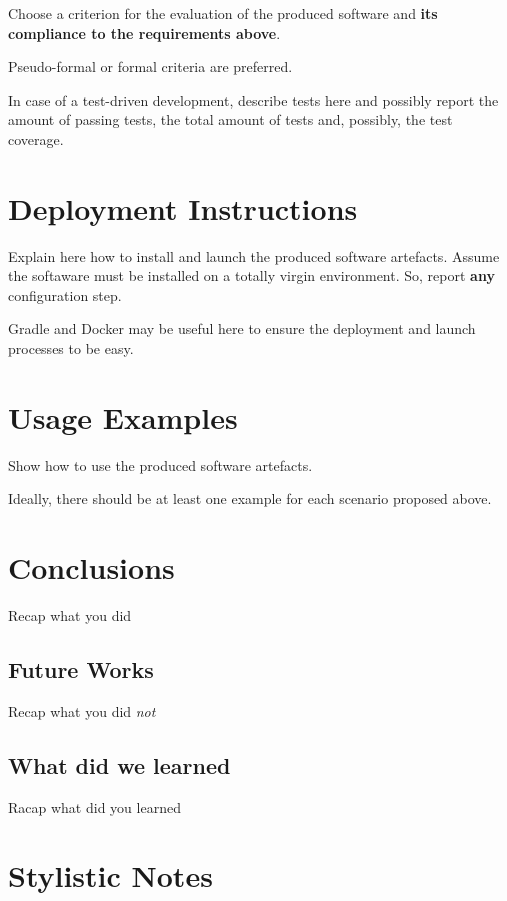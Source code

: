 \documentclass{scrartcl}
\begin{document}
Choose a criterion for the evaluation of the produced software and \textbf{its compliance to the requirements above}.

Pseudo-formal or formal criteria are preferred.

In case of a test-driven development, describe tests here and possibly report the amount of passing tests, the total amount of tests and, possibly, the test coverage.

\section{Deployment Instructions}

Explain here how to install and launch the produced software artefacts.
%
Assume the softaware must be installed on a totally virgin environment.
%
So, report \textbf{any} configuration step.

Gradle and Docker may be useful here to ensure the deployment and launch processes to be easy.

\section{Usage Examples}

Show how to use the produced software artefacts.

Ideally, there should be at least one example for each scenario proposed above.

\section{Conclusions}

Recap what you did

\subsection{Future Works}

Recap what you did \emph{not}

\subsection{What did we learned}

Racap what did you learned

\section*{Stylistic Notes}
\end{document}
